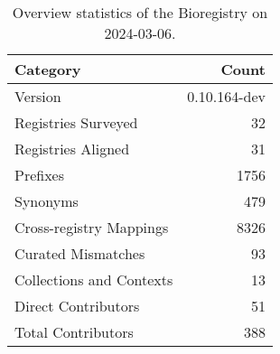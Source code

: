 \begin{table}
\caption{Overview statistics of the Bioregistry on 2024-03-06.}
\label{tab:bioregistry-summary}
\begin{tabular}{lr}
\toprule
Category & Count \\
\midrule
Version & 0.10.164-dev \\
Registries Surveyed & 32 \\
Registries Aligned & 31 \\
Prefixes & 1756 \\
Synonyms & 479 \\
Cross-registry Mappings & 8326 \\
Curated Mismatches & 93 \\
Collections and Contexts & 13 \\
Direct Contributors & 51 \\
Total Contributors & 388 \\
\bottomrule
\end{tabular}
\end{table}
